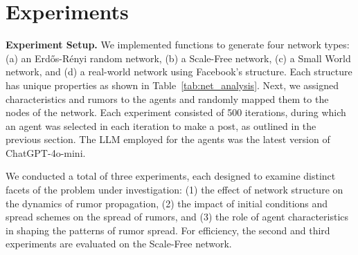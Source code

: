 \section{Experiments}
\label{sec:eval}

\noindent\textbf{Experiment Setup.} We implemented functions to generate four network types: 
(a) an Erdős-Rényi random network, 
(b) a Scale-Free network, 
(c) a Small World network, and 
(d) a real-world network using Facebook's structure.
Each structure has unique properties as shown in Table~\ref{tab:net_analysis}. 
Next, we assigned characteristics and rumors to the agents and randomly mapped them to the nodes of the network. 
Each experiment consisted of 500 iterations, during which an agent was selected in each iteration to make a post, as outlined in the previous section. 
The LLM employed for the agents was the latest version of ChatGPT-4o-mini.


We conducted a total of three experiments, each designed to examine distinct facets of the problem under investigation: 
(1) the effect of network structure on the dynamics of rumor propagation, 
(2) the impact of initial conditions and spread schemes on the spread of rumors, and 
(3) the role of agent characteristics in shaping the patterns of rumor spread. 
For efficiency, the second and third experiments are evaluated on the Scale-Free network.



